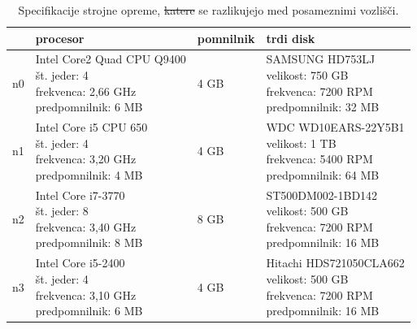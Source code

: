 \documentclass[a4paper, 12pt]{book}
\providecommand{\DIFaddtex}[1]{{\protect\color{blue}\uwave{#1}}} %
\providecommand{\DIFdeltex}[1]{{\protect\color{red}\sout{#1}}}                      %
\providecommand{\DIFaddFL}[1]{\DIFadd{#1}} %
\providecommand{\DIFdelFL}[1]{\DIFdel{#1}} %
\providecommand{\DIFaddbeginFL}{} %
\providecommand{\DIFaddendFL}{} %
\providecommand{\DIFdelbeginFL}{} %
\providecommand{\DIFdelendFL}{} %
\providecommand{\DIFadd}[1]{\texorpdfstring{\DIFaddtex{#1}}{#1}} %
\providecommand{\DIFdel}[1]{\texorpdfstring{\DIFdeltex{#1}}{}} %
\newcommand{\DIFscaledelfig}{0.5}
\newlength{\DIFdelgraphicswidth} %
\newlength{\DIFdelgraphicsheight} %
\newcommand{\DIFaddincludegraphics}[2][]{{\color{blue}\fbox{\DIFOincludegraphics[#1]{#2}}}} %
\newcommand{\DIFdelincludegraphics}[2][]{%
\sbox{\DIFdelgraphicsbox}{\DIFOincludegraphics[#1]{#2}}%
\settoboxwidth{\DIFdelgraphicswidth}{\DIFdelgraphicsbox} %
\settoboxtotalheight{\DIFdelgraphicsheight}{\DIFdelgraphicsbox} %
\scalebox{\DIFscaledelfig}{%
\parbox[b]{\DIFdelgraphicswidth}{\usebox{\DIFdelgraphicsbox}\\[-\baselineskip] \rule{\DIFdelgraphicswidth}{0em}}\llap{\resizebox{\DIFdelgraphicswidth}{\DIFdelgraphicsheight}{%
\setlength{\unitlength}{\DIFdelgraphicswidth}%
\begin{picture}(1,1)%
\thicklines\linethickness{2pt} %
{\color[rgb]{1,0,0}\put(0,0){\framebox(1,1){}}}%
{\color[rgb]{1,0,0}\put(0,0){\line( 1,1){1}}}%
{\color[rgb]{1,0,0}\put(0,1){\line(1,-1){1}}}%
\end{picture}%
}\hspace*{3pt}}} %
} %
\DeclareRobustCommand{\DIFaddbeginFL}{\DIFOaddbeginFL \let\includegraphics\DIFaddincludegraphics} %
\DeclareRobustCommand{\DIFaddendFL}{\DIFOaddendFL \let\includegraphics\DIFOincludegraphics} %
\DeclareRobustCommand{\DIFdelbeginFL}{\DIFOdelbeginFL \let\includegraphics\DIFdelincludegraphics} %
\DeclareRobustCommand{\DIFdelendFL}{\DIFOaddendFL \let\includegraphics\DIFOincludegraphics} %
\begin{document}
\begin{table}[H]
\begin{center}
\begin{tabular}{ l|l|l|l } 
    & \textbf{procesor} & \textbf{pomnilnik} & \textbf{trdi disk} \\
\hline
n0 & \makecell[l]{Intel Core2 Quad CPU Q9400\\št. jeder: 4\\frekvenca: 2,66 GHz\\predpomnilnik: 6 MB} & 4 GB & \makecell[l]{SAMSUNG HD753LJ\\velikost: 750 GB\\frekvenca: 7200 RPM\\predpomnilnik: 32 MB} \\
\hline
n1 & \makecell[l]{Intel Core i5 CPU 650\\št. jeder: 4\\frekvenca: 3,20 GHz\\predpomnilnik: 4 MB} & 4 GB & \makecell[l]{WDC WD10EARS-22Y5B1\\velikost: 1 TB\\frekvenca: 5400 RPM\\predpomnilnik: 64 MB} \\
\hline
n2 & \makecell[l]{Intel Core i7-3770\\št. jeder: 8\\frekvenca: 3,40 GHz\\predpomnilnik: 8 MB} & 8 GB & \makecell[l]{ST500DM002-1BD142\\velikost: 500 GB\\frekvenca: 7200 RPM\\predpomnilnik: 16 MB} \\
\hline
n3 & \makecell[l]{Intel Core i5-2400\\št. jeder: 4\\frekvenca:  3,10 GHz \\predpomnilnik: 6 MB} & 4 GB & \makecell[l]{Hitachi HDS721050CLA662\\velikost: 500 GB\\frekvenca: 7200 RPM\\predpomnilnik: 16 MB} \\
\end{tabular}
\end{center}
\caption{Specifikacije strojne opreme, \DIFdelbeginFL \DIFdelFL{katere }\DIFdelendFL \DIFaddbeginFL \DIFaddFL{ki }\DIFaddendFL se razlikujejo med posameznimi vozlišči.}
\label{tbl_benchmarking_nodes_hw}
\end{table}
\end{document}
